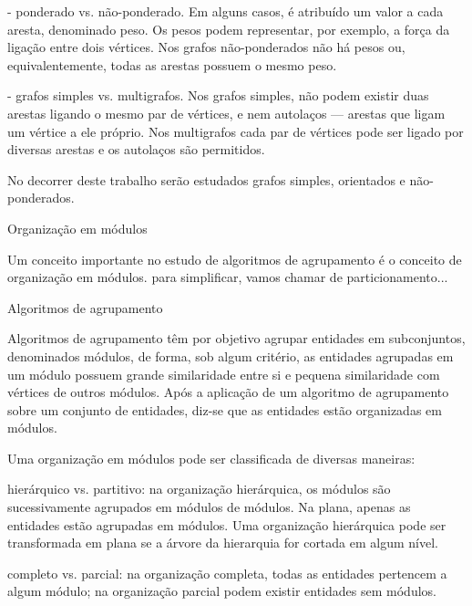 \begin{itemize}
- ponderado vs. não-ponderado. Em alguns casos, é atribuído um valor a cada aresta, denominado peso. Os pesos podem representar, por exemplo, a força da ligação entre dois vértices. Nos grafos não-ponderados não há pesos ou, equivalentemente, todas as arestas possuem o mesmo peso.

- grafos simples vs. multigrafos. Nos grafos simples, não podem existir duas arestas ligando o mesmo par de vértices, e nem autolaços --- arestas que ligam um vértice a ele próprio. Nos multigrafos cada par de vértices pode ser ligado por diversas arestas e os autolaços são permitidos.

No decorrer deste trabalho serão estudados grafos simples, orientados e não-ponderados. %

\begin{section}{Organização em módulos}

Um conceito importante no estudo de algoritmos de agrupamento é o conceito de organização em módulos. 
para simplificar, vamos chamar de particionamento...

\end{section}

\begin{section}{Algoritmos de agrupamento}

Algoritmos de agrupamento têm por objetivo agrupar entidades em subconjuntos, denominados módulos, de forma, sob algum critério, as entidades agrupadas em um módulo possuem grande similaridade entre si e pequena similaridade com vértices de outros módulos. Após a aplicação de um algoritmo de agrupamento sobre um conjunto de entidades, diz-se que as entidades estão organizadas em módulos.


Uma organização em módulos pode ser classificada de diversas maneiras:

hierárquico vs. partitivo: na organização hierárquica, os módulos são sucessivamente agrupados em módulos de módulos. Na plana, apenas as entidades estão agrupadas em módulos. Uma organização hierárquica pode ser transformada em plana se a árvore da hierarquia for cortada em algum nível.

completo vs. parcial: na organização completa, todas as entidades pertencem a algum módulo; na organização parcial podem existir entidades sem módulos.


\end{section}
\end{itemize}
